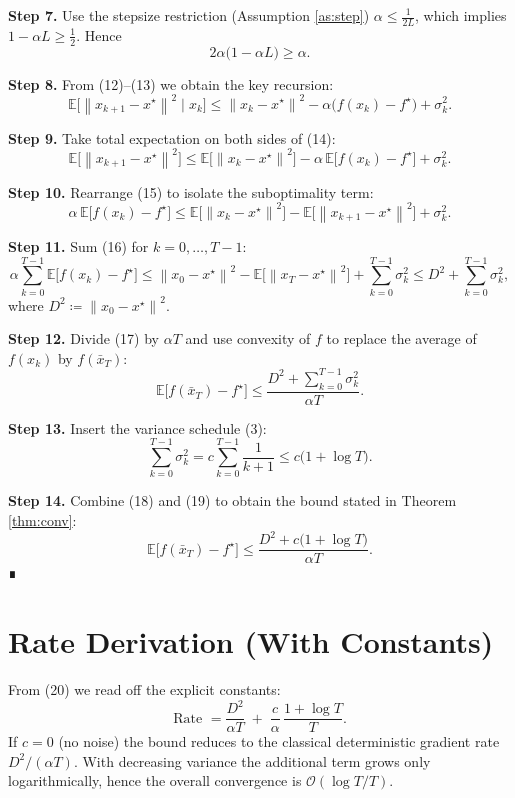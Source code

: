 \documentclass{article}
\newcommand{\E}{\mathbb{E}}
\newcommand{\norm}[1]{\left\|#1\right\|}
\begin{document}
\noindent\textbf{Step 7.} Use the stepsize restriction (Assumption
\ref{as:step}) $\alpha\le\frac{1}{2L}$, which implies $1-\alpha L\ge\frac12$.
Hence
\[
2\alpha\bigl(1-\alpha L\bigr)\ge\alpha.
\tag{13}
\]

\noindent\textbf{Step 8.} From (12)–(13) we obtain the key recursion:
\[
\E\!\bigl[\norm{x_{k+1}-x^{\star}}^{2}\mid x_{k}\bigr]
\le \norm{x_{k}-x^{\star}}^{2}
-\alpha\bigl(f(x_{k})-f^{\star}\bigr)+\sigma_{k}^{2}.
\tag{14}
\]

\noindent\textbf{Step 9.} Take total expectation on both sides of (14):
\[
\E\!\bigl[\norm{x_{k+1}-x^{\star}}^{2}\bigr]
\le \E\!\bigl[\norm{x_{k}-x^{\star}}^{2}\bigr]
-\alpha\,\E\!\bigl[f(x_{k})-f^{\star}\bigr]
+\sigma_{k}^{2}.
\tag{15}
\]

\noindent\textbf{Step 10.} Rearrange (15) to isolate the suboptimality term:
\[
\alpha\,\E\!\bigl[f(x_{k})-f^{\star}\bigr]
\le \E\!\bigl[\norm{x_{k}-x^{\star}}^{2}\bigr]
-\E\!\bigl[\norm{x_{k+1}-x^{\star}}^{2}\bigr]
+\sigma_{k}^{2}.
\tag{16}
\]

\noindent\textbf{Step 11.} Sum (16) for $k=0,\dots,T-1$:
\[
\alpha\sum_{k=0}^{T-1}\E\!\bigl[f(x_{k})-f^{\star}\bigr]
\le \norm{x_{0}-x^{\star}}^{2}
-\E\!\bigl[\norm{x_{T}-x^{\star}}^{2}\bigr]
+\sum_{k=0}^{T-1}\sigma_{k}^{2}
\le D^{2}+\sum_{k=0}^{T-1}\sigma_{k}^{2},
\tag{17}
\]
where $D^{2}\coloneqq\norm{x_{0}-x^{\star}}^{2}$.

\noindent\textbf{Step 12.} Divide (17) by $\alpha T$ and use convexity of $f$
to replace the average of $f(x_{k})$ by $f(\bar x_{T})$:
\[
\E\!\bigl[f(\bar x_{T})-f^{\star}\bigr]
\le\frac{D^{2}+\sum_{k=0}^{T-1}\sigma_{k}^{2}}{\alpha T}.
\tag{18}
\]

\noindent\textbf{Step 13.} Insert the variance schedule (3):
\[
\sum_{k=0}^{T-1}\sigma_{k}^{2}
= c\sum_{k=0}^{T-1}\frac{1}{k+1}
\le c\bigl(1+\log T\bigr).
\tag{19}
\]

\noindent\textbf{Step 14.} Combine (18) and (19) to obtain the bound
stated in Theorem \ref{thm:conv}:
\[
\E\!\bigl[f(\bar x_{T})-f^{\star}\bigr]
\le\frac{D^{2}+c\bigl(1+\log T\bigr)}{\alpha T}.
\tag{20}
\]
∎

\section*{Rate Derivation (With Constants)}
From (20) we read off the explicit constants:
\[
\boxed{
\text{Rate } = \frac{D^{2}}{\alpha T}
\;+\;
\frac{c}{\alpha}\,\frac{1+\log T}{T}}.
\]
If $c=0$ (no noise) the bound reduces to the classical deterministic
gradient rate $D^{2}/(\alpha T)$.  
With decreasing variance the additional term grows only logarithmically,
hence the overall convergence is $\mathcal O(\log T/T)$.
\end{document}
